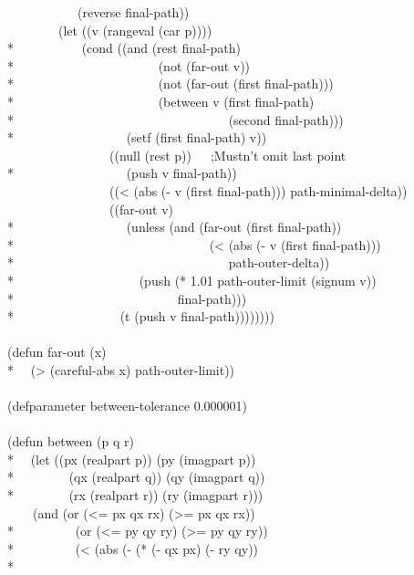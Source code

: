 \begin{new}
\begin{lisp}
~~~~~~~~~~~(reverse final-path)) \\
~~~~~~~~(let ((v (rangeval (car p)))) \\*
~~~~~~~~~~(cond ((and (rest final-path) \\*
~~~~~~~~~~~~~~~~~~~~~~(not (far-out v)) \\*
~~~~~~~~~~~~~~~~~~~~~~(not (far-out (first final-path))) \\*
~~~~~~~~~~~~~~~~~~~~~~(between v (first final-path) \\*
~~~~~~~~~~~~~~~~~~~~~~~~~~~~~~~~~(second final-path))) \\*
~~~~~~~~~~~~~~~~~(setf (first final-path) v)) \\
~~~~~~~~~~~~~~~~((null (rest p))~~~;Mustn't omit last point \\*
~~~~~~~~~~~~~~~~~(push v final-path)) \\
~~~~~~~~~~~~~~~~((< (abs (- v (first final-path))) path-minimal-delta)) \\
~~~~~~~~~~~~~~~~((far-out v) \\*
~~~~~~~~~~~~~~~~~(unless (and (far-out (first final-path)) \\*
~~~~~~~~~~~~~~~~~~~~~~~~~~~~~~(< (abs (- v (first final-path))) \\*
~~~~~~~~~~~~~~~~~~~~~~~~~~~~~~~~~path-outer-delta)) \\*
~~~~~~~~~~~~~~~~~~~(push (* 1.01 path-outer-limit (signum v)) \\*
~~~~~~~~~~~~~~~~~~~~~~~~~final-path))) \\*
~~~~~~~~~~~~~~~~(t (push v final-path)))))))) \\
\\
(defun far-out (x) \\*
~~(> (careful-abs x) path-outer-limit)) \\
\\
(defparameter between-tolerance 0.000001) \\
\\
(defun between (p q r) \\*
~~(let ((px (realpart p)) (py (imagpart p)) \\*
~~~~~~~~(qx (realpart q)) (qy (imagpart q)) \\*
~~~~~~~~(rx (realpart r)) (ry (imagpart r))) \\
~~~~(and (or (<= px qx rx) (>= px qx rx)) \\*
~~~~~~~~~(or (<= py qy ry) (>= py qy ry)) \\*
~~~~~~~~~(< (abs (- (* (- qx px) (- ry qy)) \\*

\end{lisp}
\end{new}
